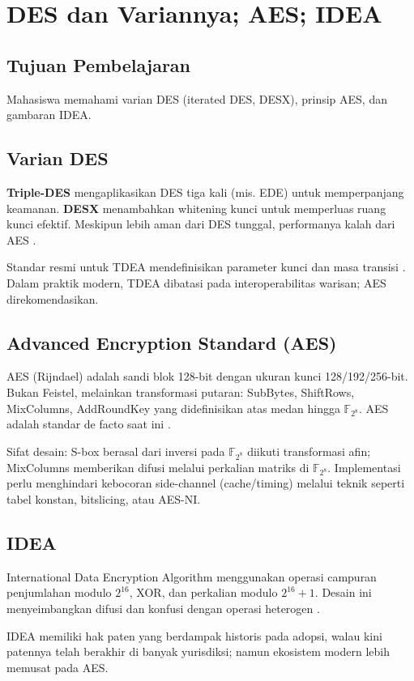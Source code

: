 \documentclass[../main.tex]{subfiles}
\begin{document}
\chapter{DES dan Variannya; AES; IDEA}

\section{Tujuan Pembelajaran}
Mahasiswa memahami varian DES (iterated DES, DESX), prinsip AES, dan gambaran IDEA.

\section{Varian DES}
\textbf{Triple-DES} mengaplikasikan DES tiga kali (mis. EDE) untuk memperpanjang keamanan. \textbf{DESX} menambahkan whitening kunci untuk memperluas ruang kunci efektif. Meskipun lebih aman dari DES tunggal, performanya kalah dari AES \citep{stallings}.

Standar resmi untuk TDEA mendefinisikan parameter kunci dan masa transisi \citep{nist_sp_800_67r2}. Dalam praktik modern, TDEA dibatasi pada interoperabilitas warisan; AES direkomendasikan.

\section{Advanced Encryption Standard (AES)}
AES (Rijndael) adalah sandi blok 128-bit dengan ukuran kunci 128/192/256-bit. Bukan Feistel, melainkan transformasi putaran: SubBytes, ShiftRows, MixColumns, AddRoundKey yang didefinisikan atas medan hingga \(\mathbb{F}_{2^8}\). AES adalah standar de facto saat ini \citep{nist_aes}.

Sifat desain: S-box berasal dari inversi pada \(\mathbb{F}_{2^8}\) diikuti transformasi afin; MixColumns memberikan difusi melalui perkalian matriks di \(\mathbb{F}_{2^8}\). Implementasi perlu menghindari kebocoran side-channel (cache/timing) melalui teknik seperti tabel konstan, bitslicing, atau AES-NI.

\section{IDEA}
International Data Encryption Algorithm menggunakan operasi campuran penjumlahan modulo \(2^{16}\), XOR, dan perkalian modulo \(2^{16}+1\). Desain ini menyeimbangkan difusi dan konfusi dengan operasi heterogen \citep{stallings}.

IDEA memiliki hak paten yang berdampak historis pada adopsi, walau kini patennya telah berakhir di banyak yurisdiksi; namun ekosistem modern lebih memusat pada AES.
\end{document}
